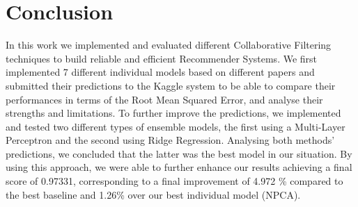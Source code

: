\documentclass[10pt,conference,compsocconf]{IEEEtran}
\begin{document}
\section{Conclusion}
\label{conc}

In this work we implemented and evaluated different Collaborative Filtering techniques to build reliable and efficient Recommender Systems. We first implemented 7 different individual models based on different papers and submitted their predictions to the Kaggle system to be able to compare their performances in terms of the Root Mean Squared Error, and analyse their strengths and limitations. To further improve the predictions, we implemented and tested two different types of ensemble models, the first using a Multi-Layer Perceptron and the second using Ridge Regression. Analysing both methods' predictions, we concluded that the latter was the best model in our situation. By using this approach, we were able to further enhance our results achieving a final score of 0.97331, corresponding to a final improvement of 4.972 \% compared to the best baseline and 1.26\% over our best individual model (NPCA).




\end{document}
